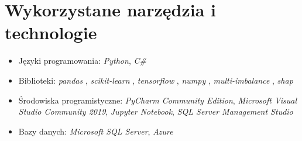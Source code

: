 \section{Wykorzystane narzędzia i technologie}
\begin{itemize}
    \item Języki programowania: \textit{Python}, \textit{C\#}
    \item Biblioteki: \textit{pandas} \cite{reback2020pandas}, \textit{scikit-learn} \cite{scikit-learn}, \textit{tensorflow} \cite{tensorflow2015-whitepaper}, \textit{numpy} \cite{harris2020array}, \textit{multi-imbalance} \cite{MultiImbalance2020}, \textit{shap} \cite{NIPS2017_7062}
    \item Środowiska programistyczne: \textit{PyCharm Community Edition}, \textit{Microsoft Visual Studio Community 2019}, \textit{Jupyter Notebook}, \textit{SQL Server Management Studio}
    \item Bazy danych: \textit{Microsoft SQL Server}, \textit{Azure}
\end{itemize}
